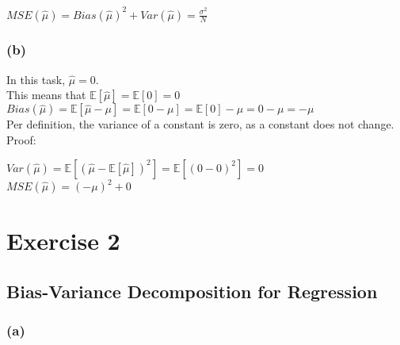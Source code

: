 \documentclass{article}
\begin{document}
$MSE(\hat{\mu})= Bias(\hat{\mu})^2 + Var(\hat{\mu}) = \frac{\sigma^2}{N}$

\subsubsection*{(b)}

In this task, $\hat{\mu} = 0$. \\

This means that $\mathbb{E}[\hat{\mu}]=\mathbb{E}[0]=0$ \\

$Bias(\hat{\mu})= \mathbb{E}[\hat{\mu} - \mu] = \mathbb{E}[0 - \mu] = \mathbb{E}[0] - \mu = 0 - \mu = - \mu$ \\

Per definition, the variance of a constant is zero, as a constant does not change. Proof:

$Var(\hat{\mu})= \mathbb{E}[(\hat{\mu} - \mathbb{E}[\hat{\mu}])^2] = \mathbb{E}[(0 - 0)^2] = 0$\\

$MSE(\hat{\mu})=(-\mu)^2 + 0$

\section*{Exercise 2}
\subsection*{Bias-Variance Decomposition for Regression}
\subsubsection*{(a)}
\end{document}
